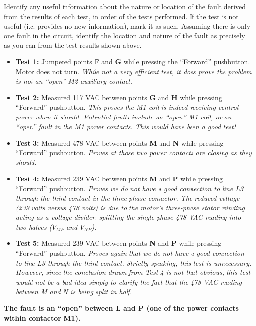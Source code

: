 Identify any useful information about the nature or location of the fault derived from the results of each test, in order of the tests performed.  If the test is not useful (i.e. provides no new information), mark it as such.  Assuming there is only one fault in the circuit, identify the location and nature of the fault as precisely as you can from the test results shown above.







\begin{itemize}
\item{} {\bf Test 1:} Jumpered points {\bf F} and {\bf G} while pressing the ``Forward'' pushbutton.  Motor does not turn.  {\it While not a very efficient test, it does prove the problem is not an ``open'' M2 auxiliary contact.}
\vskip 5pt
\item{} {\bf Test 2:} Measured 117 VAC between points {\bf G} and {\bf H} while pressing ``Forward'' pushbutton.  {\it This proves the M1 coil is indeed receiving control power when it should.  Potential faults include an ``open'' M1 coil, or an ``open'' fault in the M1 power contacts.  This would have been a good  test!}
\vskip 5pt
\item{} {\bf Test 3:} Measured 478 VAC between points {\bf M} and {\bf N} while pressing ``Forward'' pushbutton.  {\it Proves at those two power contacts are closing as they should.}
\vskip 5pt
\item{} {\bf Test 4:} Measured 239 VAC between points {\bf M} and {\bf P} while pressing ``Forward'' pushbutton.  {\it Proves we do not have a good connection to line L3 through the third contact in the three-phase contactor.  The reduced voltage (239 volts versus 478 volts) is due to the motor's three-phase stator winding acting as a voltage divider, splitting the single-phase 478 VAC reading into two halves ($V_{MP}$ and $V_{NP}$).}
\vskip 5pt
\item{} {\bf Test 5:} Measured 239 VAC between points {\bf N} and {\bf P} while pressing ``Forward'' pushbutton.  {\it Proves again that we do not have a good connection to line L3 through the third contact.  Strictly speaking, this test is unnecessary.  However, since the conclusion drawn from Test 4 is not that obvious, this test would not be a bad idea simply to clarify the fact that the 478 VAC reading between M and N is being split in half.}
\end{itemize}

\vskip 10pt

{\bf The fault is an ``open'' between L and P (one of the power contacts within contactor M1).}











